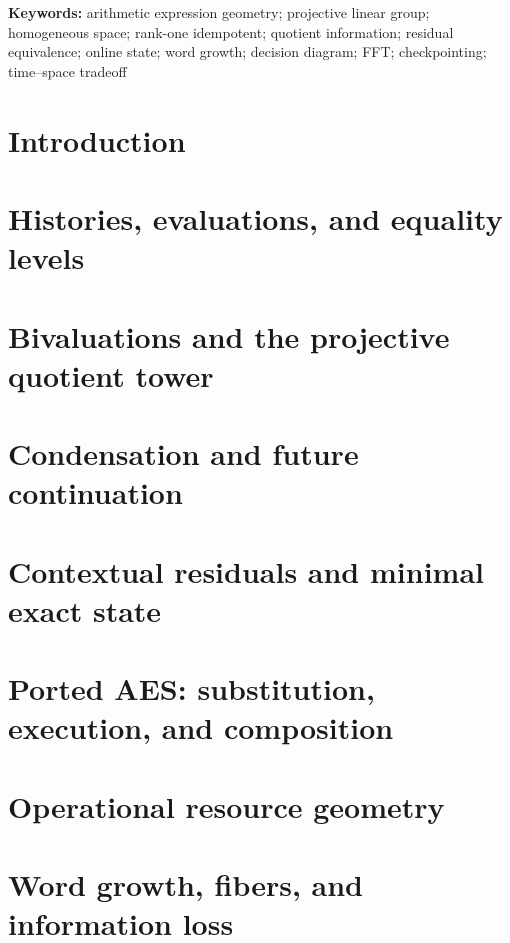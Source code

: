 \documentclass[11pt]{article}
\theoremstyle{definition}
\theoremstyle{remark}
\begin{document}
\noindent\textbf{Keywords:}
arithmetic expression geometry; projective linear group; homogeneous space;
rank-one idempotent; quotient information; residual equivalence; online state;
word growth; decision diagram; FFT; checkpointing; time--space tradeoff

\setcounter{tocdepth}{2}
\tableofcontents
\newpage

\section{Introduction}\label{sec:introduction}

\section{Histories, evaluations, and equality levels}\label{sec:history-equality}

\section{Bivaluations and the projective quotient tower}\label{sec:projective-quotients}

\section{Condensation and future continuation}\label{sec:condensation-continuation}

\section{Contextual residuals and minimal exact state}\label{sec:contextual-residuals}

\section{Ported AES: substitution, execution, and composition}\label{sec:ported-aes}

\section{Operational resource geometry}\label{sec:operational-resources}

\section{Word growth, fibers, and information loss}\label{sec:growth-information}

\end{document}
